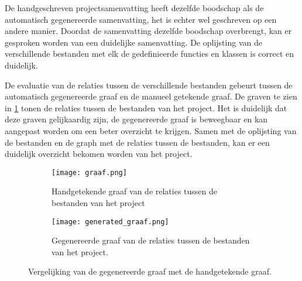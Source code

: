 De handgeschreven projectsamenvatting heeft dezelfde boodschap als de automatisch gegenereerde samenvatting, het is echter wel geschreven op een andere manier.
Doordat de samenvatting dezelfde boodschap overbrengt, kan er gesproken worden van een duidelijke samenvatting.
De oplijsting van de verschillende bestanden met elk de gedefinieerde functies en klassen is correct en duidelijk.

De evaluatie van de relaties tussen de verschillende bestanden gebeurt tussen de automatisch gegenereerde graaf en de manueel getekende graaf.
De graven te zien in \ref{fig:evaluatie-graaf} tonen de relaties tussen de bestanden van het project. 
Het is duidelijk dat deze graven gelijkaardig zijn, de gegenereerde graaf is beweegbaar en kan aangepast worden om een beter overzicht te krijgen.
Samen met de oplijsting van de bestanden en de graph met de relaties tussen de bestanden, kan er een duidelijk overzicht bekomen worden van het project.

\begin{figure}
    \centering
    \begin{subfigure}[b]{1\textwidth}
        \centering
        \texttt{[image: graaf.png]}
        \caption{Handgetekende graaf van de relaties tussen de bestanden van het project \autocite{Simmons2019}}
    \end{subfigure}
    \hfill
    \begin{subfigure}[b]{0.5\textwidth}
        \centering
        \texttt{[image: generated\_graaf.png]}
        \caption{Gegenereerde graaf van de relaties tussen de bestanden van het project. \autocite{Simmons2019}}
    \end{subfigure}
    \caption{Vergelijking van de gegenereerde graaf met de handgetekende graaf.}
    \label{fig:evaluatie-graaf}
\end{figure}